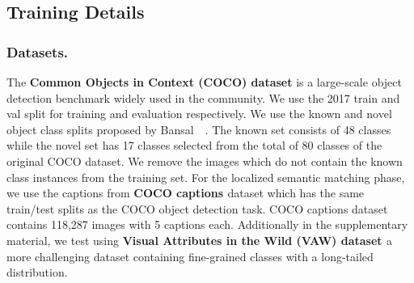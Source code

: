 

\subsection{Training Details}
\subsubsection{Datasets.}
The \textbf{Common Objects in Context (COCO) dataset} \cite{lin2014microsoft} is a large-scale object detection benchmark widely used in the community. We use the 2017 train and val split for training and evaluation respectively. We use the known and novel object class splits proposed by Bansal~\etal~\cite{bansal2018zero}. The known set consists of 48 classes while the novel set has 17 classes selected from the total of 80 classes of the original COCO dataset. We remove the images which do not contain the known class instances from the training set. 
For the localized semantic matching phase, we use the captions from \textbf{COCO captions \cite{chen2015microsoft}} dataset which has the same train/test splits as the COCO object detection task. COCO captions dataset contains 118,287 images with 5 captions each. 
Additionally in the supplementary material, we test \modelname using \textbf{Visual Attributes in the Wild (VAW) dataset \cite{Pham_2021_CVPR}} a more challenging dataset containing fine-grained classes with a long-tailed distribution.
